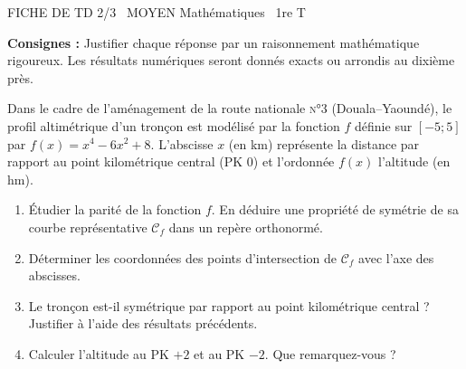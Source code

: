 \documentclass[11pt]{article}
\begin{document}
\begin{tcolorbox}[enhanced,colback=popink,colframe=popink,arc=10pt,boxrule=0pt,left=12pt,right=12pt,top=9pt,bottom=9pt]
{\color{white}\popxbold\small FICHE DE TD 2/3 \textbullet\ MOYEN \hfill Mathématiques \textbullet\ 1re T\par}
\end{tcolorbox}
\vspace{4pt}
\noindent \textbf{Consignes :} Justifier chaque réponse par un raisonnement mathématique rigoureux. Les résultats numériques seront donnés exacts ou arrondis au dixième près.

\begin{exercice}
\label{exo:route}
Dans le cadre de l'aménagement de la route nationale \textsc{n}°3 (Douala--Yaoundé), le profil altimétrique d'un tronçon est modélisé par la fonction $f$ définie sur $[-5; 5]$ par $f(x) = x^4 - 6x^2 + 8$. L'abscisse $x$ (en km) représente la distance par rapport au point kilométrique central (PK 0) et l'ordonnée $f(x)$ l'altitude (en hm).
\begin{enumerate}
    \item Étudier la parité de la fonction $f$. En déduire une propriété de symétrie de sa courbe représentative $\mathcal{C}_f$ dans un repère orthonormé.
    \item Déterminer les coordonnées des points d'intersection de $\mathcal{C}_f$ avec l'axe des abscisses.
    \item Le tronçon est-il symétrique par rapport au point kilométrique central ? Justifier à l'aide des résultats précédents.
    \item Calculer l'altitude au PK $+2$ et au PK $-2$. Que remarquez-vous ?
\end{enumerate}
\end{exercice}
\end{document}
